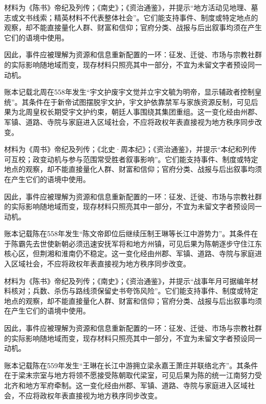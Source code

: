 材料为《陈书》帝纪及列传；《南史》；《资治通鉴》，并提示“地方活动见地理、墓志或文书线索；精英材料不代表整体社会”。它们能支持事件、制度或特定地点的观察，却不能直接量化人群、财富和信仰；官府分类、战报与后出叙事均须在产生它们的语境中使用。

因此，事件应被理解为资源和信息重新配置的一环：征发、迁徙、市场与宗教社群的实际影响随地域而变，现存材料只照亮其中一部分，不宜为未留文字者预设同一动机。

账本记载北周在558年发生“宇文护废宇文觉并立宇文毓为明帝，显示辅政者控制皇统”。其条件在于新帝试图摆脱宇文护，宇文护依靠禁军与家族资源反制，可见后果为北周皇权长期受宇文护约束，朝廷人事围绕其集团重组。这一变化经由州郡、军镇、道路、寺院与家庭进入区域社会，不应将政权年表直接视为地方秩序同步改变。

材料为《周书》帝纪及列传；《北史·周本纪》；《资治通鉴》，并提示“本纪和列传可互校；政变动机与参与范围常受胜者叙事影响”。它们能支持事件、制度或特定地点的观察，却不能直接量化人群、财富和信仰；官府分类、战报与后出叙事均须在产生它们的语境中使用。

因此，事件应被理解为资源和信息重新配置的一环：征发、迁徙、市场与宗教社群的实际影响随地域而变，现存材料只照亮其中一部分，不宜为未留文字者预设同一动机。

账本记载陈在558年发生“陈文帝即位后继续压制王琳等长江中游势力”。其条件在于陈霸先去世使新朝必须迅速安抚军将和地方州镇，可见后果为陈朝逐步守住江东核心区，但荆湘和淮南仍不稳定。这一变化经由州郡、军镇、道路、寺院与家庭进入区域社会，不应将政权年表直接视为地方秩序同步改变。

材料为《陈书》帝纪及列传；《南史》；《资治通鉴》，并提示“战事年月可据编年材料核对；兵数、杀伤与路线须保留史书夸饰风险”。它们能支持事件、制度或特定地点的观察，却不能直接量化人群、财富和信仰；官府分类、战报与后出叙事均须在产生它们的语境中使用。

因此，事件应被理解为资源和信息重新配置的一环：征发、迁徙、市场与宗教社群的实际影响随地域而变，现存材料只照亮其中一部分，不宜为未留文字者预设同一动机。

账本记载陈在559年发生“王琳在长江中游拥立梁永嘉王萧庄并联络北齐”。其条件在于梁末宗室与地方将领不愿接受陈朝取代梁室，可见后果为陈的统一江南努力受北齐和地方军府牵制。这一变化经由州郡、军镇、道路、寺院与家庭进入区域社会，不应将政权年表直接视为地方秩序同步改变。

